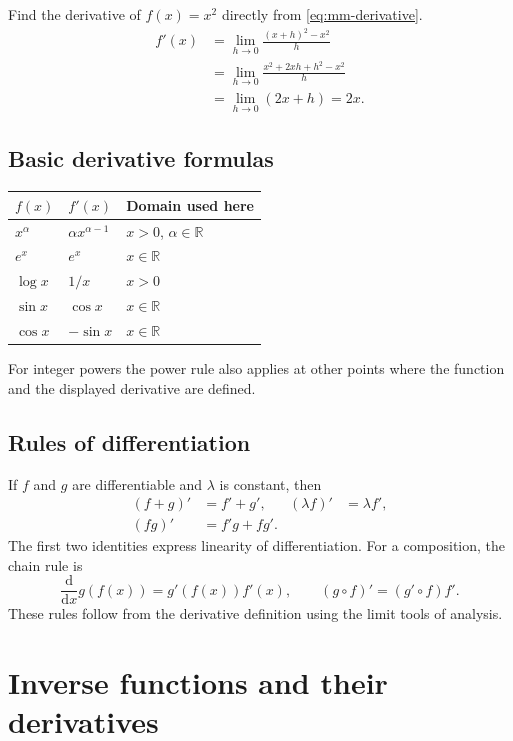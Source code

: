 \begin{example}
Find the derivative of $f(x)=x^2$ directly from \eqref{eq:mm-derivative}.
\begin{align*}
 f'(x)
 &=\lim_{h\to0}\frac{(x+h)^2-x^2}{h}\\
 &=\lim_{h\to0}\frac{x^2+2xh+h^2-x^2}{h}\\
 &=\lim_{h\to0}(2x+h)=2x.
\end{align*}
\end{example}

\subsection{Basic derivative formulas}
\begin{center}
\begin{tabular}{lll}
\toprule
$f(x)$ & $f'(x)$ & Domain used here\\
\midrule
$x^\alpha$ & $\alpha x^{\alpha-1}$ & $x>0$, $\alpha\in\mathbb R$\\
$e^x$ & $e^x$ & $x\in\mathbb R$\\
$\log x$ & $1/x$ & $x>0$\\
$\sin x$ & $\cos x$ & $x\in\mathbb R$\\
$\cos x$ & $-\sin x$ & $x\in\mathbb R$\\
\bottomrule
\end{tabular}
\end{center}
For integer powers the power rule also applies at other points where the
function and the displayed derivative are defined.

\subsection{Rules of differentiation}
If $f$ and $g$ are differentiable and $\lambda$ is constant, then
\begin{align*}
 (f+g)'&=f'+g', & (\lambda f)'&=\lambda f',\\
 (fg)'&=f'g+fg'.
\end{align*}
The first two identities express linearity of differentiation.
For a composition, the chain rule is
\[
 \frac{\mathrm d}{\mathrm dx}g(f(x))=g'(f(x))f'(x),
 \qquad (g\circ f)'=(g'\circ f)f'.
\]
These rules follow from the derivative definition using the limit tools of analysis.

\section{Inverse functions and their derivatives}

